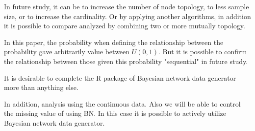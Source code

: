 In future study, it can be to increase the number of node topology, to less sample size, or to increase the cardinality. Or by applying another algorithms, in addition it is possible to compare analyzed by combining two or more mutually topology.

In this paper, the probability when defining the relationship between the probability gave arbitrarily value between $U(0,1)$. But it is possible to confirm the relationship between those given this probability "sequential" in future study.

It is desirable to complete the R package of Bayesian network data generator more than anything else.

In addition, analysis using the continuous data. Also we will be able to control the missing value of using BN. In this case it is possible to actively utilize Bayesian network data generator.